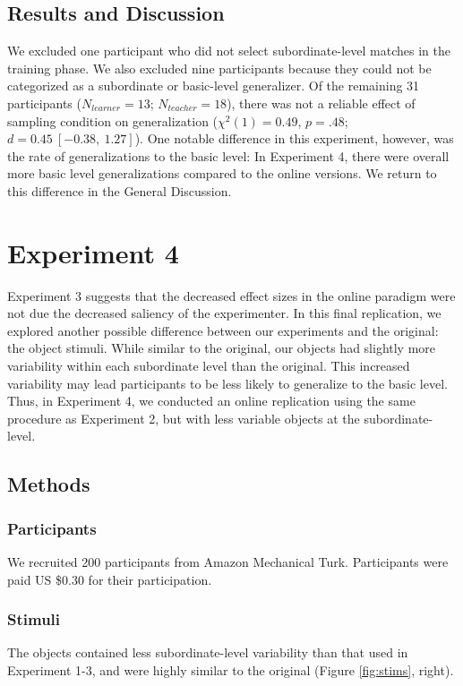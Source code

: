 \documentclass[man]{apa2}
\begin{document}
\subsection{Results and Discussion}
We excluded one participant who did not select subordinate-level matches in the training phase.  We also excluded nine participants because they could not be categorized as a subordinate or basic-level generalizer. Of the remaining 31 participants ($N_{learner} = 13$; $N_{teacher} = 18$), there was not a reliable effect of sampling condition on generalization ($\chi^2(1) = 0.49$,  $p = .48$; $d = 0.45\ [-0.38,\ 1.27]$). One notable difference in this experiment, however, was the rate of generalizations to the basic level: In Experiment 4, there were overall more basic level generalizations compared to the online versions. We return to this difference in the General Discussion.

\section{Experiment 4}
Experiment 3 suggests that the decreased effect sizes in the online paradigm were not due the decreased saliency of the experimenter. In this final replication, we explored another possible difference between our experiments and the original: the object stimuli. While similar to the original, our objects had slightly more variability within each subordinate level  than the original. This increased variability may lead participants to be less likely to generalize to the basic level. Thus, in Experiment 4, we conducted an online replication using the same procedure as Experiment 2, but with less variable objects at the subordinate-level. 

\subsection{Methods}

\subsubsection{Participants}   We recruited 200 participants from Amazon Mechanical Turk. Participants were paid US \$0.30 for their participation.

\subsubsection{Stimuli}
The objects contained less subordinate-level variability than that used in Experiment 1-3, and were highly similar to the original (Figure \ref{fig:stims}, right).
\end{document}
